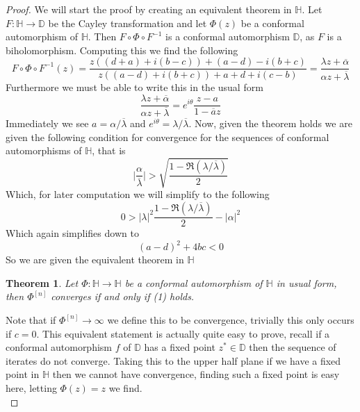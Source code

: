 \documentclass{article}
\newcommand{\DD}{\mathbb{D}}
\newcommand{\HH}{\mathbb{H}}
\newcommand{\ov}{\overline}
\newtheorem{theorem}{Theorem}
\begin{document}
\begin{proof}
We will start the proof by creating an equivalent theorem in $\HH$. Let $F:\HH\to\DD$ be the Cayley transformation and let $\Phi(z)$ be a conformal automorphism of $\HH$. Then $F\circ \Phi \circ F^{-1}$ is a conformal automorphism $\DD$, as $F$ is a biholomorphism. Computing this we find the following
\begin{equation*}
        F\circ \Phi \circ F^{-1}(z) = \frac{z((d+a)+i(b-c))+(a-d)-i(b+c)}{z((a-d)+i(b+c))+a+d+i(c-b)} = \frac{\lambda z + \ov{\alpha}}{\alpha  z + \ov{\lambda}}
\end{equation*}
Furthermore we must be able to write this in the usual form
\begin{equation*}
        \frac{\lambda z + \ov{\alpha}}{\alpha  z + \ov{\lambda}} = e^{i\theta} \frac{z-a}{1-\ov{a}z}
\end{equation*}
Immediately we see $a=\alpha/\ov{\lambda}$ and $e^{i\theta} = \lambda/\ov{\lambda}$. Now, given the theorem holds we are given the following condition for convergence for the sequences of conformal automorphisms of $\HH$, that is 
\begin{equation*}
         \bigg|\frac{\alpha}{\ov{\lambda}}\bigg| > \sqrt{\frac{1-\Re(\lambda/\ov{\lambda})}{2}}
\end{equation*}
Which, for later computation we will simplify to the following
\begin{equation*}
       0>|\lambda|^2\frac{1-\Re(\lambda/\ov{\lambda})}{2} - |\alpha|^2
\end{equation*}
Which again simplifies down to
\begin{equation}
        (a-d)^2+4bc<0
\end{equation}
So we are given the equivalent theorem in $\HH$\\
\begin{theorem}
    Let $\Phi:\HH\to\HH$ be a conformal automorphism of $\HH$ in usual form, then $\Phi^{[n]}$ converges if and only if (1) holds.
\end{theorem}
Note that if $\Phi^{[n]}\to\infty$ we define this to be convergence, trivially this only occurs if $c=0$. This equivalent statement is actually quite easy to prove, recall if a conformal automorphism $f$ of $\DD$ has a fixed point $z^*\in\DD$ then the sequence of iterates do not converge. Taking this to the upper half plane if we have a fixed point in $\HH$ then we cannot have convergence, finding such a fixed point is easy here, letting $\Phi(z)=z$ we find.
\begin{equation*}

\end{equation*}
\end{proof}
\end{document}

